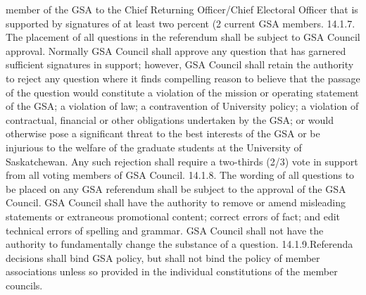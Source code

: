 \documentclass{article}
\begin{document}
member of the GSA to the Chief Returning Officer/Chief Electoral 
Officer that is supported by signatures of at least two percent (2%
current GSA members. 
14.1.7. The placement of all questions in the referendum shall be subject to 
GSA Council approval. Normally GSA Council shall approve any 
question that has garnered sufficient signatures in support; however, 
GSA Council shall retain the authority to reject any question where it 
finds compelling reason to believe that the passage of the question 
would constitute a violation of the mission or operating statement of 
the GSA; a violation of law; a contravention of University policy; a 
violation of contractual, financial or other obligations undertaken by 
the GSA; or would otherwise pose a significant threat to the best 
interests of the GSA or be injurious to the welfare of the graduate 
students at the University of Saskatchewan. Any such rejection shall 
require a two-thirds (2/3) vote in support from all voting members of 
GSA Council. 
14.1.8. The wording of all questions to be placed on any GSA referendum 
shall be subject to the approval of the GSA Council. GSA Council 
 shall have the authority to remove or amend misleading statements or 
 extraneous promotional content; correct errors of fact; and edit 
 technical errors of spelling and grammar. GSA Council shall not have 
 the authority to fundamentally change the substance of a question. 
14.1.9.Referenda decisions shall bind GSA policy, but shall not bind the 
 policy of member associations unless so provided in the individual 
 constitutions of the member councils. 
\end{document}
